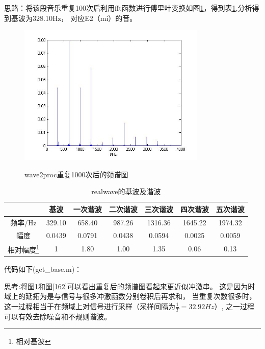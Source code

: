 \documentclass{ctexart}
\begin{document}
        思路：将该段音乐重复100次后利用fft函数进行傅里叶变换如图\ref{18}，得到表\ref{sheet1},分析得到基波为328.10Hz，
        对应E2（mi）的音。
				
        \begin{figure}
            \centering
            \includegraphics[width=0.8\textwidth]{fmt/1_8.jpg}\\
            \caption{wave2proc重复1000次后的频谱图\label{18}}

        \end{figure}
        
        \begin{table}
            \centering
            \begin{tabular}{|c|c|c|c|c|c|c|}
                \hline
                &基波&一次谐波&二次谐波&三次谐波&四次谐波&五次谐波\\
                \hline
                频率/Hz&329.10&658.40&987.26&1316.36&1645.22&1974.32\\
                \hline
                幅度&0.0439&0.0791&0.0438&0.0594&0.0025&0.0059\\
                \hline
                相对幅度\footnote{相对基波}&1&1.80&1.00&1.35&0.06&0.13\\
                \hline
            \end{tabular}
            \caption{realwave的基波及谐波\label{sheet1}}
        \end{table}

				代码如下(get\_base.m)：
        

        思考:将图\ref{18}和图\ref{162}可以看出重复后的频谱图看起来更近似冲激串。
        这是因为时域上的延拓为是与信号与很多冲激函数分别卷积后再求和，
        当重复次数很多时，这一过程相当于在频域上对信号进行采样（采样间隔为$\frac{1}{T}=32.92Hz$）,
        之一过程可以有效去除噪音和不规则谐波。
\end{document}
